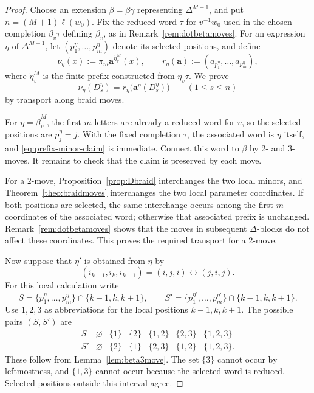 \documentclass[12pt, reqno]{amsart}
\theoremstyle{plain}
\theoremstyle{definition}
\numberwithin{equation}{section}
\begin{document}
\begin{proof}
Choose an extension $\overline\beta=\beta\gamma$ representing
$\Delta^{M+1}$, and put $n=(M+1)\ell(w_0)$. Fix the reduced word $\tau$
for $v^{-1}w_0$ used in the chosen completion $\beta_v\tau$ defining
$\dot\beta_v$, as in Remark~\ref{rem:dotbetamoves}. For an expression
$\eta$ of $\Delta^{M+1}$, let $(p_1^\eta,\ldots,p_m^\eta)$ denote its
selected positions, and define
\[
    \nu_\eta(x):=\pi_m\mathbf a^{\dot\eta_v^M}(x),\qquad
    r_\eta(\mathbf a):=(a_{p_1^\eta},\ldots,a_{p_m^\eta}),
\]
where $\dot\eta_v^M$ is the finite prefix constructed from $\eta_v\tau$.
We prove
\begin{equation}\label{eq:prefix-minor-claim}
    \nu_\eta(D_s^\eta)
    =r_\eta\bigl(\mathbf a^\eta(D_s^\eta)\bigr)
    \qquad(1\leq s\leq n)
\end{equation}
by transport along braid moves.

For $\eta=\dot\beta_v^M$, the first $m$ letters are already a reduced
word for $v$, so the selected positions are $p_j^\eta=j$. With the
fixed completion $\tau$, the associated word is $\eta$ itself, and
\eqref{eq:prefix-minor-claim} is immediate. Connect this word to
$\overline\beta$ by $2$- and $3$-moves. It remains to check that the
claim is preserved by each move.

For a $2$-move, Proposition~\ref{prop:Dbraid} interchanges the two
local minors, and Theorem~\ref{theo:braidmoves} interchanges the two
local parameter coordinates. If both positions are selected, the
same interchange occurs among the first $m$ coordinates of the
associated word; otherwise that associated prefix is unchanged.
Remark~\ref{rem:dotbetamoves} shows that the moves in subsequent
$\Delta$-blocks do not affect these coordinates. This proves the
required transport for a $2$-move.

Now suppose that $\eta'$ is obtained from $\eta$ by
\[
    (i_{k-1},i_k,i_{k+1})=(i,j,i)\longleftrightarrow(j,i,j).
\]
For this local calculation write
\[
    S=\{p_1^\eta,\ldots,p_m^\eta\}\cap\{k-1,k,k+1\},\qquad
    S'=\{p_1^{\eta'},\ldots,p_m^{\eta'}\}\cap\{k-1,k,k+1\}.
\]
Use $1,2,3$ as abbreviations for the local positions $k-1,k,k+1$.
The possible pairs $(S,S')$ are
\begin{equation}\label{eq:selected-local-patterns}
\begin{array}{c|cccccc}
 S & \varnothing & \{1\} & \{2\} & \{1,2\} & \{2,3\} & \{1,2,3\}\\
 \hline
 S'& \varnothing & \{2\} & \{1\} & \{2,3\} & \{1,2\} & \{1,2,3\}.
\end{array}
\end{equation}
These follow from Lemma~\ref{lem:beta3move}. The set $\{3\}$ cannot
occur by leftmostness, and $\{1,3\}$ cannot occur because the selected
word is reduced. Selected positions outside this interval agree.


\end{proof}
\end{document}
